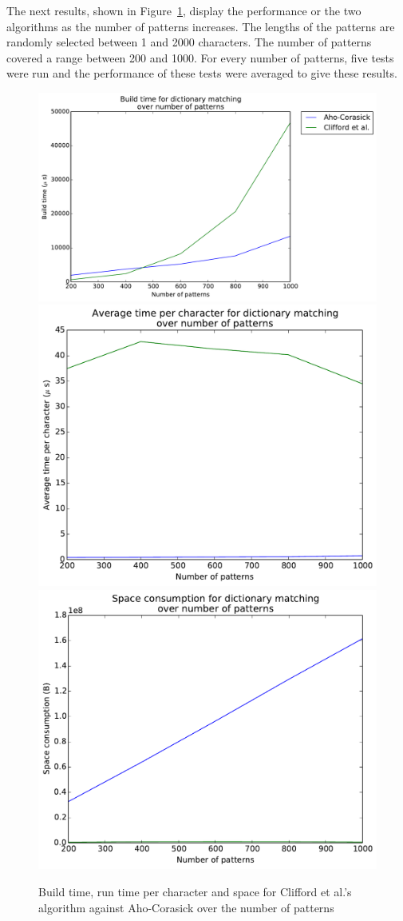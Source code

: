 \documentclass[ %
                    author={Dominic Joseph Moylett},
                    degree={MEng},
                     title={Dictionary Matching with Fingerprints},
                  subtitle={An Empirical Analysis},
                      type={research},
                      year={2015} ]{dissertation}
\begin{document}
The next results, shown in Figure~\ref{fig:many-pattern-results}, display the performance or the two algorithms as the number of patterns increases. The lengths of the patterns are randomly selected between 1 and 2000 characters. The number of patterns covered a range between 200 and 1000. For every number of patterns, five tests were run and the performance of these tests were averaged to give these results.

\begin{figure}[t]
\begin{center}
  \includegraphics[width=0.7\linewidth]{build_num_200_1000}\\
  \includegraphics[width=0.5\linewidth]{time_num_200_1000}\includegraphics[width=0.5\linewidth]{size_num_200_1000}
\end{center}
\caption{Build time, run time per character and space for Clifford et al.'s algorithm against Aho-Corasick over the number of patterns}
\label{fig:many-pattern-results}
\end{figure}
\end{document}
